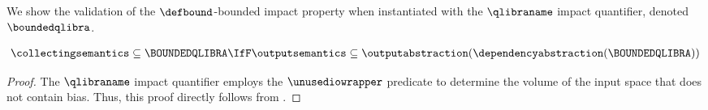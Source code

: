 We show the validation of the $\defbound$-bounded impact property when instantiated with the $\qlibraname$ impact quantifier,
denoted $\boundedqlibra$.

\begin{lemma}
  \begin{align*}
    \collectingsemantics \subseteq \BOUNDEDQLIBRA \IfF \outputsemantics \subseteq \outputabstraction(\dependencyabstraction(\BOUNDEDQLIBRA))
  \end{align*}
\end{lemma}
\begin{proof}
  The $\qlibraname$ impact quantifier employs the $\unusediowrapper$ predicate to determine the volume of the input space that does not contain bias.
  Thus, this proof directly follows from .
\end{proof}






